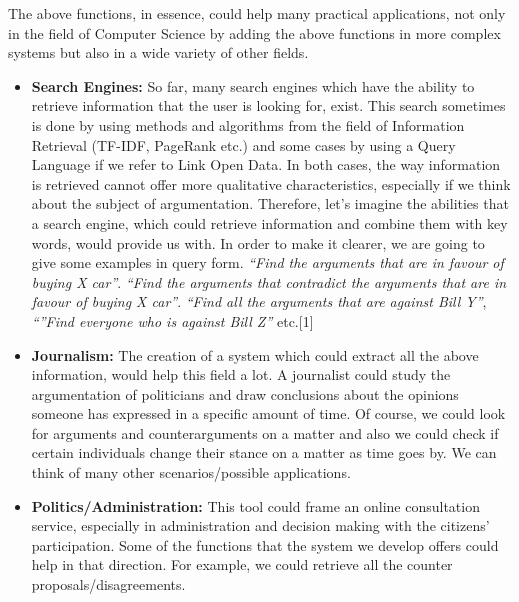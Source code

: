 The above functions, in essence, could help many practical applications, not only in the field of Computer Science by adding the above functions in more complex systems but also in a wide variety of other fields.\\

\begin{itemize}

	\item \textbf{Search Engines:} So far, many search engines which have the ability to retrieve information that the user is looking for, exist. This search sometimes is done by using methods and algorithms from the field of Information Retrieval (TF-IDF, PageRank etc.) and some cases by using a Query Language if we refer to Link Open Data. In both cases, the way information is retrieved cannot offer more qualitative characteristics, especially if we think about the subject of argumentation. Therefore, let's imagine the abilities that a search engine, which could retrieve information and combine them with key words, would  provide us with. In order to make it clearer, we are going to give some examples in query form. \textit{``Find the arguments that are in favour of buying X car''}. \textit{``Find the arguments that contradict the arguments that are in favour of buying X car''}. \textit{``Find all the arguments that are against Bill Y''}, \textit{``''Find everyone who is against Bill Z''} etc.[1]
	\item \textbf{Journalism:} The creation of a system which could extract all the above information, would help this field a lot. A journalist could study the argumentation of politicians and draw conclusions about the opinions someone has expressed  in a specific amount of time. Of course, we could look for arguments and counterarguments on a matter and also we could check if certain individuals change their stance on a matter as time goes by. We can think of many other scenarios/possible applications.
	\item \textbf{Politics/Administration:} This tool could frame an online consultation service, especially in administration and decision making with the citizens' participation. Some of the functions that the system we develop offers could help in that direction. For example, we could retrieve all the counter proposals/disagreements.\\

\end{itemize}

